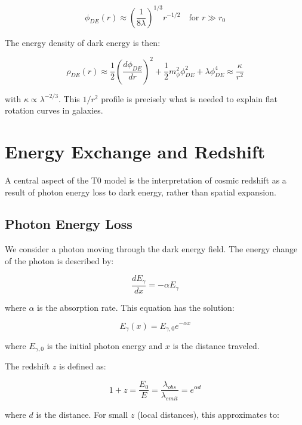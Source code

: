 \documentclass[a4paper,12pt]{article}
\begin{document}
\begin{equation}
	\phi_{DE}(r) \approx \left(\frac{1}{8\lambda}\right)^{1/3} r^{-1/2} \quad \text{for } r \gg r_0
\end{equation}

The energy density of dark energy is then:

\begin{equation}
	\rho_{DE}(r) \approx \frac{1}{2}\left(\frac{d\phi_{DE}}{dr}\right)^2 + \frac{1}{2}m_{\phi}^2\phi_{DE}^2 + \lambda\phi_{DE}^4 \approx \frac{\kappa}{r^2}
\end{equation}

with $\kappa \propto \lambda^{-2/3}$. This $1/r^2$ profile is precisely what is needed to explain flat rotation curves in galaxies.

\section{Energy Exchange and Redshift}

A central aspect of the T0 model is the interpretation of cosmic redshift as a result of photon energy loss to dark energy, rather than spatial expansion.

\subsection{Photon Energy Loss}

We consider a photon moving through the dark energy field. The energy change of the photon is described by:

\begin{equation}
	\frac{dE_{\gamma}}{dx} = -\alpha E_{\gamma}
\end{equation}

where $\alpha$ is the absorption rate. This equation has the solution:

\begin{equation}
	E_{\gamma}(x) = E_{\gamma,0} e^{-\alpha x}
\end{equation}

where $E_{\gamma,0}$ is the initial photon energy and $x$ is the distance traveled.

The redshift $z$ is defined as:

\begin{equation}
	1 + z = \frac{E_0}{E} = \frac{\lambda_{obs}}{\lambda_{emit}} = e^{\alpha d}
\end{equation}

where $d$ is the distance. For small $z$ (local distances), this approximates to:
\end{document}
